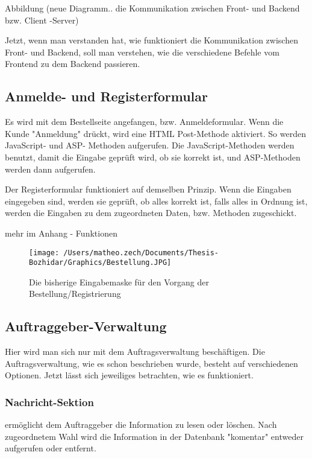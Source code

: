 Abbildung (neue Diagramm.. die Kommunikation zwischen Front- und Backend bzw. Client -Server)

Jetzt, wenn man verstanden hat, wie funktioniert die Kommunikation zwischen Front- und Backend, soll man verstehen, wie die verschiedene Befehle vom Frontend zu dem Backend passieren. 

\subsection{Anmelde- und Registerformular} 

Es wird mit dem Bestellseite angefangen, bzw. Anmeldeformular. Wenn die Kunde "Anmeldung" drückt, wird eine HTML Post-Methode aktiviert.  So werden JavaScript- und ASP- Methoden aufgerufen. Die JavaScript-Methoden werden benutzt, damit die Eingabe geprüft wird, ob sie korrekt ist, und ASP-Methoden werden dann aufgerufen. 

Der Registerformular funktioniert auf demselben Prinzip. Wenn die Eingaben eingegeben sind, werden sie geprüft, ob alles korrekt ist, falls alles in Ordnung ist, werden die Eingaben zu dem zugeordneten Daten, bzw. Methoden zugeschickt.

mehr im Anhang - Funktionen

\begin{figure}[h]
	\centering
	\texttt{[image: /Users/matheo.zech/Documents/Thesis-Bozhidar/Graphics/Bestellung.JPG]}
	\caption[Anmeldung/Bestellung]{Die bisherige Eingabemaske für den Vorgang der Bestellung/Registrierung}
	\label{fig:Bestellung}
\end{figure}

\subsection{Auftraggeber-Verwaltung}

Hier wird man sich nur mit dem Auftragsverwaltung beschäftigen. Die Auftragsverwaltung, wie es schon beschrieben wurde, besteht auf verschiedenen Optionen. Jetzt lässt sich jeweiliges betrachten, wie es funktioniert. 
	
\subsubsection{Nachricht-Sektion} ermöglicht dem Auftraggeber die Information zu lesen oder löschen. Nach zugeordnetem Wahl wird die Information in der Datenbank "komentar" entweder aufgerufen oder entfernt. 


